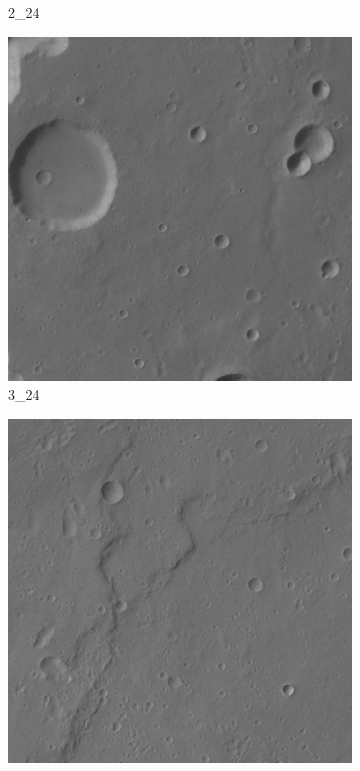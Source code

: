 \begin{figure}[H]
\begin{subfigure}{0.3\textwidth}
		\caption{2\_24}
	\end{subfigure}
	\begin{subfigure}{0.3\textwidth}
		\centering
		\includegraphics[width=\textwidth,keepaspectratio]{images/h0905_0000/3_24.jpg}
		\caption{3\_24}
	\end{subfigure}
	\begin{subfigure}{0.3\textwidth}
		\centering
		\includegraphics[width=\textwidth,keepaspectratio]{images/h0905_0000/1_25.jpg}

\end{subfigure}
\end{figure}
